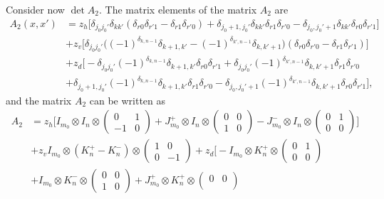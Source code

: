 \documentclass[12pt,reqno]{amsart}
\numberwithin{equation}{section}
\newcommand{\de}{\delta}
\begin{document}
\begin{appendix}
Consider now $\det A_2$. The matrix elements of the matrix $ A_2$ are
\begin{equation}\label{k2m1}
\begin{aligned}
A_2(x,x')&=z_h\big[\de_{j_0j_0'}\de_{kk'}(\de_{r0}\de_{r'1}-\de_{r1}\de_{r'0})
+\de_{j_0+1,j_0'}\de_{kk'}\de_{r1}\de_{r'0}
-\de_{j_0,j_0'+1}\de_{kk'}\de_{r0}\de_{r'1}\big]\\
&+z_v\big[\de_{j_0j_0'}\big((-1)^{\de_{k,n-1}}\de_{k+1,k'}-(-1)^{\de_{k',n-1}}\de_{k,k'+1}\big)(\de_{r0}\de_{r'0}-\de_{r1}\de_{r'1})\big]\\
&+z_d\big[-\de_{j_0j_0'}(-1)^{\de_{k,n-1}}\de_{k+1,k'}\de_{r0}\de_{r'1}+\de_{j_0j_0'}(-1)^{\de_{k',n-1}}\de_{k,k'+1}\de_{r1}\de_{r'0}\\ 
&+\de_{j_0+1,j_0'}(-1)^{\de_{k,n-1}}\de_{k+1,k'}\de_{r1}\de_{r'0}
-\de_{j_0,j_0'+1}(-1)^{\de_{k',n-1}}\de_{k,k'+1}\de_{r0}\de_{r'1} \big],
\end{aligned}
\end{equation}
and the matrix $A_2$ can be written as
\begin{equation}\label{k2m2}
\begin{aligned}
A_2&=z_h\bigg[I_{m_0}\otimes I_n\otimes
\begin{pmatrix}
0 & 1 \\
-1 & 0
\end{pmatrix}
+J_{m_0}^+\otimes I_n \otimes 
\begin{pmatrix}
0 & 0 \\
1 & 0
\end{pmatrix}
-J_{m_0}^-\otimes I_n \otimes 
\begin{pmatrix}
0 & 1 \\
0 & 0
\end{pmatrix}
\bigg]\\
&+z_v I_{m_0}\otimes (K_n^+-K_n^-)\otimes \begin{pmatrix}
1 & 0 \\
0 & -1
\end{pmatrix}
+z_d\bigg[-I_{m_0}\otimes K_n^+\otimes \begin{pmatrix}
0 & 1 \\
0 & 0
\end{pmatrix}\\
&+I_{m_0}\otimes K_n^-\otimes \begin{pmatrix}
0 & 0 \\
1 & 0
\end{pmatrix}
+J_{m_0}^+\otimes K_n^+\otimes \begin{pmatrix}
0 & 0 \\

\end{pmatrix}
\end{aligned}
\end{equation}
\end{appendix}
\end{document}
